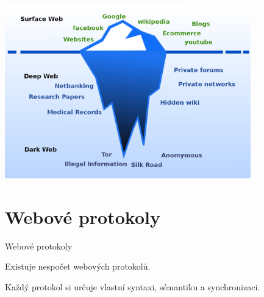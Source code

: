 \documentclass[aspectratio=169]{beamer}
\begin{document}
\begin{frame}
    \begin{center}
        \includegraphics[width=0.8\textwidth]{img/dwdwwww.jpg}
    \end{center}
\end{frame}



\section{Webové protokoly}
\begin{frame}{Webové protokoly}
    \begin{cardTiny}
        \begin{center}
            Existuje nespočet webových protokolů.

            Každý protokol si určuje vlastní syntaxi, sémantiku a synchronizaci.
        \end{center}
    \end{cardTiny}
\end{frame}
\end{document}

